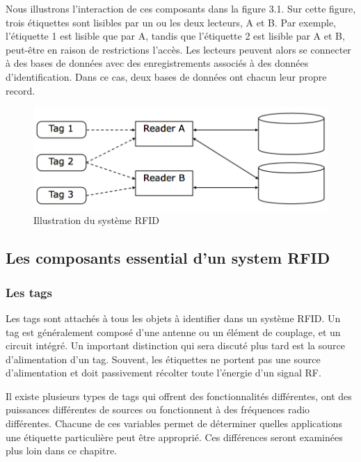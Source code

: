 \documentclass[11pt, a4paper, twoside]{book}
\begin{document}
Nous illustrons l'interaction de ces composants dans la figure 3.1. Sur cette figure, trois étiquettes sont lisibles par un ou les deux lecteurs, A et B. Par exemple, l'étiquette 1 est lisible que par A, tandis que l'étiquette 2 est lisible par A et B, peut-être en raison de restrictions l'accès. Les lecteurs peuvent alors se connecter à des bases de données avec des enregistrements associés à des données d'identification. Dans ce cas, deux bases de données ont chacun leur propre record.\\
\begin{figure}[H]
\centering
\includegraphics[width=\textwidth]{shema}
\caption{Illustration du système RFID}
\end{figure}
\subsection{Les composants essential d'un system RFID}
\subsubsection{Les tags}
Les tags sont attachés à tous les objets à identifier dans un système RFID. Un tag est généralement
composé d'une antenne ou un élément de couplage, et un circuit intégré. Un important
distinction qui sera discuté plus tard est la source d'alimentation d'un tag. Souvent, les étiquettes ne portent pas une source d'alimentation et doit passivement récolter toute l'énergie d'un signal RF.

Il existe plusieurs types de tags qui offrent des fonctionnalités différentes, ont des puissances différentes
de sources ou fonctionnent à des fréquences radio différentes. Chacune de ces variables permet de déterminer
quelles applications une étiquette particulière peut être approprié. Ces différences seront examinées plus loin dans ce chapitre.
\end{document}
